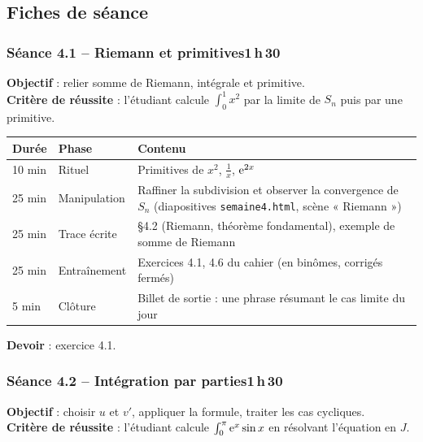 \documentclass[10.5pt,a4paper]{article}
\newif\ifprof
\newcommand{\profonly}[1]{\ifprof #1\fi}
\begin{document}
\subsection{Fiches de séance}
\subsubsection*{\textcolor{marine}{Séance 4.1 -- Riemann et primitives}\hfill\normalfont\small\textcolor{ardoise}{1\,h\,30}}
\begin{objectif}\textbf{Objectif} : relier somme de Riemann, intégrale et primitive.\\\textbf{Critère de réussite} : l'étudiant calcule $\int_0^1x^2$ par la limite de $S_n$ puis par une primitive.\end{objectif}\nopagebreak
\begin{longtable}{@{}p{1.1cm}p{2.4cm}p{12.4cm}@{}}
\toprule \textbf{Durée} & \textbf{Phase} & \textbf{Contenu}\\ \midrule\endhead
10 min & Rituel & Primitives de $x^2$, $\frac1x$, $\mathrm{e}^{2x}$\\
25 min & Manipulation & Raffiner la subdivision et observer la convergence de $S_n$ (diapositives \texttt{semaine4.html}, scène « Riemann »)\\
25 min & Trace écrite & \S4.2 (Riemann, théorème fondamental), exemple de somme de Riemann\\
25 min & Entraînement & Exercices 4.1, 4.6 du cahier (en binômes, corrigés fermés)\\
5 min & Clôture & Billet de sortie : une phrase résumant le cas limite du jour\\ \bottomrule\end{longtable}\nopagebreak
\textbf{Devoir} : exercice 4.1.\profonly{ \textbf{Point de vigilance} : Contrôler $S_4=\frac7{32}$ à la main avant d'écrire la formule.}\par
{}\subsubsection*{\textcolor{marine}{Séance 4.2 -- Intégration par parties}\hfill\normalfont\small\textcolor{ardoise}{1\,h\,30}}
\begin{objectif}\textbf{Objectif} : choisir $u$ et $v'$, appliquer la formule, traiter les cas cycliques.\\\textbf{Critère de réussite} : l'étudiant calcule $\int_0^\pi\mathrm{e}^x\sin x$ en résolvant l'équation en $J$.\end{objectif}\nopagebreak
\end{document}
